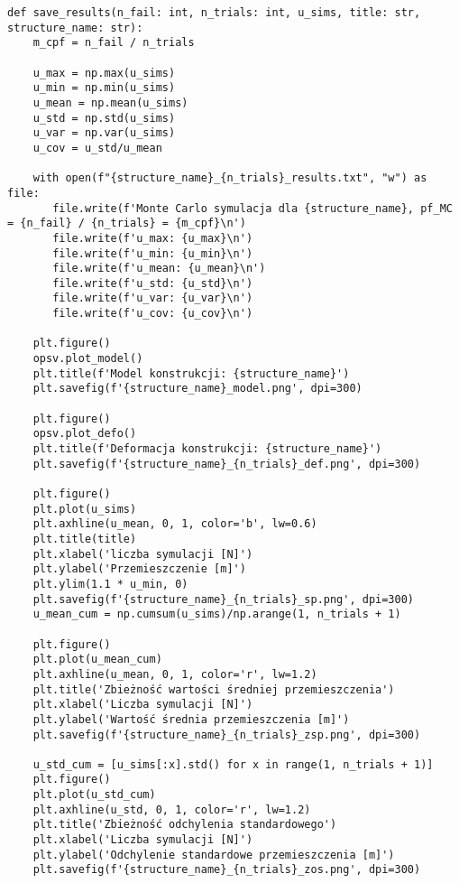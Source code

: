 \begin{lstlisting}
def save_results(n_fail: int, n_trials: int, u_sims, title: str, structure_name: str):
    m_cpf = n_fail / n_trials

    u_max = np.max(u_sims)
    u_min = np.min(u_sims)
    u_mean = np.mean(u_sims)
    u_std = np.std(u_sims)
    u_var = np.var(u_sims)
    u_cov = u_std/u_mean

    with open(f"{structure_name}_{n_trials}_results.txt", "w") as file:
       file.write(f'Monte Carlo symulacja dla {structure_name}, pf_MC = {n_fail} / {n_trials} = {m_cpf}\n')
       file.write(f'u_max: {u_max}\n')
       file.write(f'u_min: {u_min}\n')
       file.write(f'u_mean: {u_mean}\n')
       file.write(f'u_std: {u_std}\n')
       file.write(f'u_var: {u_var}\n')
       file.write(f'u_cov: {u_cov}\n')

    plt.figure()
    opsv.plot_model()
    plt.title(f'Model konstrukcji: {structure_name}')
    plt.savefig(f'{structure_name}_model.png', dpi=300)

    plt.figure()
    opsv.plot_defo()
    plt.title(f'Deformacja konstrukcji: {structure_name}')
    plt.savefig(f'{structure_name}_{n_trials}_def.png', dpi=300)

    plt.figure()
    plt.plot(u_sims)
    plt.axhline(u_mean, 0, 1, color='b', lw=0.6)
    plt.title(title)
    plt.xlabel('liczba symulacji [N]')
    plt.ylabel('Przemieszczenie [m]')
    plt.ylim(1.1 * u_min, 0)
    plt.savefig(f'{structure_name}_{n_trials}_sp.png', dpi=300)
    u_mean_cum = np.cumsum(u_sims)/np.arange(1, n_trials + 1)

    plt.figure()
    plt.plot(u_mean_cum)
    plt.axhline(u_mean, 0, 1, color='r', lw=1.2)
    plt.title('Zbieżność wartości średniej przemieszczenia')
    plt.xlabel('Liczba symulacji [N]')
    plt.ylabel('Wartość średnia przemieszczenia [m]')
    plt.savefig(f'{structure_name}_{n_trials}_zsp.png', dpi=300)

    u_std_cum = [u_sims[:x].std() for x in range(1, n_trials + 1)]
    plt.figure()
    plt.plot(u_std_cum)
    plt.axhline(u_std, 0, 1, color='r', lw=1.2)
    plt.title('Zbieżność odchylenia standardowego')
    plt.xlabel('Liczba symulacji [N]')
    plt.ylabel('Odchylenie standardowe przemieszczenia [m]')
    plt.savefig(f'{structure_name}_{n_trials}_zos.png', dpi=300)
\end{lstlisting}